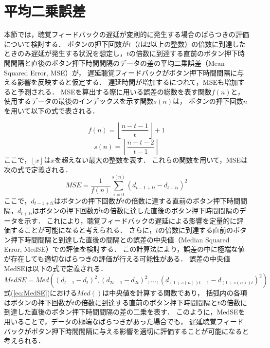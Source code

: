 \section{平均二乗誤差}
本節では，聴覚フィードバックの遅延が変則的に発生する場合のばらつきの評価について検討する．
ボタンの押下回数が$t$（$t$は2以上の整数）の倍数に到達したときのみ遅延が発生する状況を想定し，$t$の倍数に到達する直前のボタン押下時間間隔と直後のボタン押下時間間隔のデータの差の平均二乗誤差（Mean Squared Error, MSE）が，
遅延聴覚フィードバックがボタン押下時間間隔に与える影響を反映すると仮定する．
遅延時間が増加するにつれて，MSEも増加すると予測される．
MSEを算出する際に用いる誤差の総数を表す関数$f(n)$と，使用するデータの最後のインデックスを示す関数$s(n)$は，
ボタンの押下回数$n$を用いて以下の式で表される．

\begin{equation}
f(n) = \left\lfloor \frac{n-t-1}{t} \right\rfloor + 1
\end{equation}
\begin{equation}
s(n) = \left\lfloor \frac{n-t-2}{t-1} \right\rfloor
\end{equation}
ここで，$\left\lfloor x \right\rfloor$は$x$を超えない最大の整数を表す．
これらの関数を用いて，MSEは次の式で定義される．
\begin{equation}
MSE = \frac{1}{f(n)} \sum_{i=0}^{s(n)} (d_{t-1+ti} - d_{t+ti})^2
\end{equation}
ここで，$d_{t-1+ti}$はボタンの押下回数が$t$の倍数に達する直前のボタン押下時間間隔，$d_{t+ti}$はボタンの押下回数が$t$の倍数に達した直後のボタン押下時間間隔のデータを示す．
これにより，聴覚フィードバックの遅延による影響を定量的に評価することが可能になると考えられる．
さらに，$t$の倍数に到達する直前のボタン押下時間間隔と到達した直後の間隔との誤差の中央値（Median Squared Error, MedSE）での評価を検討する．
この計算法により，誤差の中に極端な値が存在しても適切なばらつきの評価が行える可能性がある．
誤差の中央値MedSEは以下の式で定義される．
\begin{equation}
MedSE = Med\left((d_{t-1}-d_{t})^2, (d_{2t-1}-d_{2t})^2, \ldots, (d_{\left(1+s(n)\right)t-1}-d_{\left(1+s(n)\right)t})^2\right) \label{eq:MedSE}
\end{equation}
式(\ref{eq:MedSE})における$Med()$は中央値を計算する関数であり，
括弧内の各項はボタンの押下回数が$t$の倍数に到達する直前のボタン押下時間間隔と$t$の倍数に到達した直後のボタン押下時間間隔の差の二乗を表す．
このように，MedSEを用いることで，データの極端なばらつきがあった場合でも，
遅延聴覚フィードバックがボタン押下時間間隔に与える影響を適切に評価することが可能になると考えられる．

